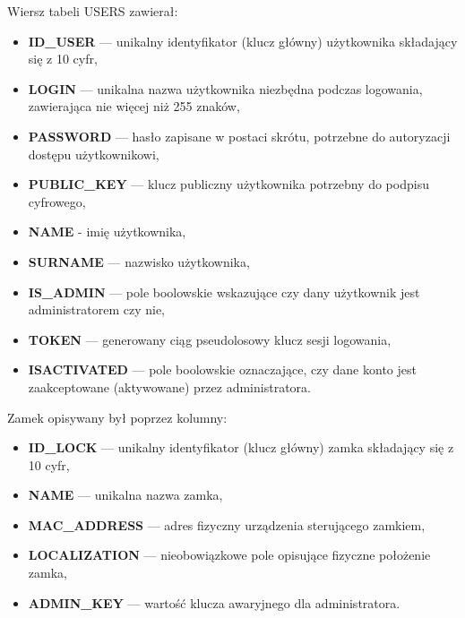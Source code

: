 	Wiersz tabeli USERS zawierał:
	\begin{itemize}
		\item \textbf{ID\_USER} --- unikalny identyfikator (klucz główny) użytkownika składający się z 10 cyfr,
		\item \textbf{LOGIN} --- unikalna nazwa użytkownika niezbędna podczas logowania, zawierająca nie więcej niż 255 znaków,
		\item \textbf{PASSWORD} --- hasło zapisane w postaci skrótu, potrzebne do autoryzacji dostępu użytkownikowi,
		\item \textbf{PUBLIC\_KEY} --- klucz publiczny użytkownika potrzebny do podpisu cyfrowego,
		\item \textbf{NAME} - imię użytkownika,
		\item \textbf{SURNAME} --- nazwisko użytkownika,
		\item \textbf{IS\_ADMIN} --- pole boolowskie wskazujące czy dany użytkownik jest administratorem czy nie,
		\item \textbf{TOKEN} --- generowany ciąg pseudolosowy klucz sesji logowania,
		\item  \textbf{ISACTIVATED} --- pole boolowskie oznaczające, czy dane konto jest zaakceptowane (aktywowane) przez administratora.
	\end{itemize}
	
	Zamek opisywany był poprzez kolumny:
	\begin{itemize}
		\item \textbf{ID\_LOCK} --- unikalny identyfikator (klucz główny) zamka składający się z 10 cyfr,
		\item \textbf{NAME} --- unikalna nazwa zamka,
		\item \textbf{MAC\_ADDRESS} --- adres fizyczny urządzenia sterującego zamkiem,
		\item \textbf{LOCALIZATION} --- nieobowiązkowe pole opisujące fizyczne położenie zamka,
		\item  \textbf{ADMIN\_KEY} --- wartość klucza awaryjnego dla administratora.
	\end{itemize}
	\newpage
	
